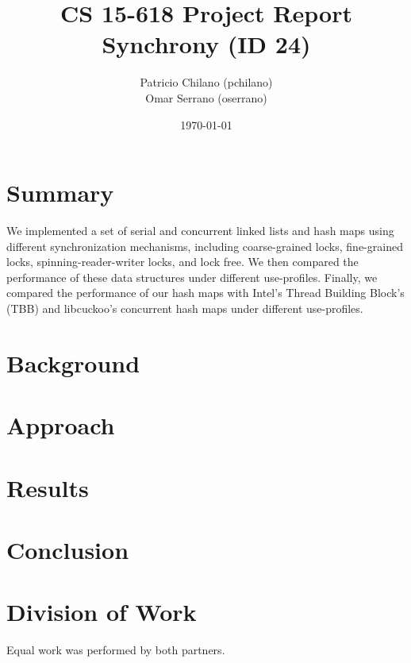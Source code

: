 \documentclass[11pt]{article}
\title{\vspace{-25pt}
\huge CS 15-618 Project Report \\
\huge Synchrony (ID 24)
}
\author{
    Patricio Chilano (pchilano) \\
    Omar Serrano (oserrano)
}
\date{\today}
\begin{document}


\maketitle

\section*{Summary}
We implemented a set of serial and concurrent linked lists and hash maps using
different synchronization mechanisms, including coarse-grained locks,
fine-grained locks, spinning-reader-writer locks, and lock free. We then
compared the performance of these data structures under different use-profiles.
Finally, we compared the performance of our hash maps with Intel's Thread
Building Block's (TBB) and libcuckoo's concurrent hash maps under different
use-profiles.

\section*{Background}

\section*{Approach}

\section*{Results}

\section*{Conclusion}

\section*{Division of Work}
Equal work was performed by both partners.

\end{document}
